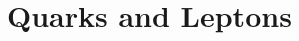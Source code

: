 \documentclass{article}
\begin{document}
\setcounter{section}{1}
\section{Quarks and Leptons}





\end{document}
